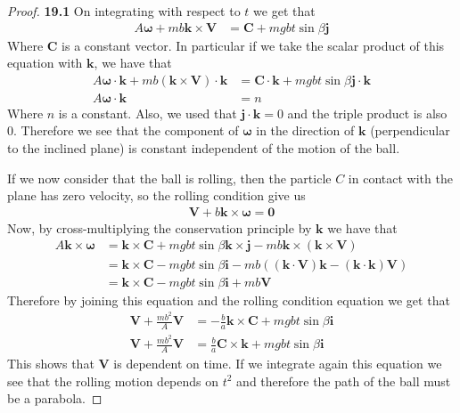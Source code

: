 \documentclass[11pt]{article}
\newcommand{\uvi}{\bm{i}}
\newcommand{\uvj}{\bm{j}}
\newcommand{\uvk}{\bm{k}}
\theoremstyle{definition}
\begin{document}
\begin{proof}{\textbf{19.1}}
    On integrating with respect to $t$ we get that
    \begin{align*}
        A\bm{\omega} + mb\bm{k}\times\bm{V} &= \bm{C} + mgbt\sin\beta\bm{j}
    \end{align*}
    Where $\bm{C}$ is a constant vector. In particular if we take the scalar
    product of this equation with $\bm{k}$, we have that
    \begin{align*}
        A\bm{\omega}\cdot\uvk + mb(\bm{k}\times\bm{V})\cdot\uvk
        &= \bm{C}\cdot\uvk + mgbt\sin\beta\bm{j}\cdot\uvk\\
        A\bm{\omega}\cdot\uvk &= n
    \end{align*}
    Where $n$ is a constant. Also, we used that $\uvj \cdot \uvk = 0$ and 
    the triple product is also 0. Therefore we see that the component of
    $\bm\omega$ in the direction of $\uvk$ (perpendicular to the inclined
    plane) is constant independent of the motion of the ball.

    If we now consider that the ball is rolling, then the particle $C$ in
    contact with the plane has zero velocity, so the rolling condition give us
    \begin{align*}
        \bm{V} + b\uvk \times \bm{\omega} = \bm{0}
    \end{align*}
    Now, by cross-multiplying the conservation principle by $\uvk$ we have that 
    \begin{align*}
        A\uvk \times \bm{\omega}
        &= \uvk \times \bm{C} + mgbt\sin\beta\uvk\times\uvj
        - mb\uvk \times(\bm{k}\times\bm{V})\\
        &= \uvk \times \bm{C} - mgbt\sin\beta\uvi
        - mb((\uvk\cdot\bm{V})\uvk - (\uvk\cdot\uvk)\bm{V})\\
        &= \uvk \times \bm{C} - mgbt\sin\beta\uvi + mb\bm{V}
    \end{align*}
    Therefore by joining this equation and the rolling condition equation
    we get that 
    \begin{align*}
        \bm{V} + \frac{mb^2}{A}\bm{V}
        &= -\frac{b}{a}\uvk \times \bm{C} + mgbt\sin\beta\uvi\\
        \bm{V} + \frac{mb^2}{A}\bm{V}
        &= \frac{b}{a}\bm{C}\times\uvk + mgbt\sin\beta\uvi
    \end{align*}
    This shows that $\bm{V}$ is dependent on time. If
    we integrate again this equation we see that the rolling motion
    depends on $t^2$ and therefore the path of the ball must be a parabola.  
\end{proof}
\end{document}
